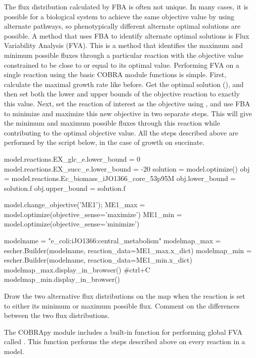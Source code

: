 The flux distribution calculated by FBA is often not unique. In many cases, it is possible for a biological system to achieve the same objective value by using alternate pathways, so phenotypically different alternate optimal solutions are possible.
A method that uses FBA to identify alternate optimal solutions is Flux Variability Analysis (FVA).
This is a method that identifies the maximum and minimum possible fluxes through a particular reaction with the objective value constrained to be close to or equal to its optimal value. Performing FVA on a single reaction using the basic COBRA module functions is simple.
First, calculate the maximal growth rate like before.
Get the optimal solution (), and then set both the lower and upper bounds of the objective reaction to exactly this value.
Next, set the reaction of interest as the objective using , and use FBA to minimize and maximize this new objective in two separate steps.
This will give the minimum and maximum possible fluxes through this reaction while contributing to the optimal objective value.
All the steps described above are performed by the script below, in the case of growth on succinate.
\begin{code-python}
model.reactions.EX_glc_e.lower_bound = 0
model.reactions.EX_succ_e.lower_bound = -20
solution = model.optimize()
obj = model.reactions.Ec_biomass_iJO1366_core_53p95M
obj.lower_bound = solution.f
obj.upper_bound = solution.f

model.change_objective('ME1');
ME1_max = model.optimize(objective_sense='maximize')
ME1_min = model.optimize(objective_sense='minimize')

modelname = "e_coli:iJO1366:central_metabolism"
modelmap_max = escher.Builder(modelname,
	reaction_data=ME1_max.x_dict)
modelmap_min = escher.Builder(modelname,
	reaction_data=ME1_min.x_dict)
modelmap_max.display_in_browser()
#ctrl+C
modelmap_min.display_in_browser()
\end{code-python}

\begin{questions}
\setcounter{question}{0}
\question Draw the two alternative flux distributions on the map when the  reaction is set to either its minimum or maximum possible flux. Comment on the differences between the two flux distributions.
\begin{solutionorbox}[3cm]

\end{solutionorbox}
\end{questions}
The COBRApy module includes a built-in function for performing global FVA called \linebreak {}.
This function performs the steps described above on every reaction in a model.

